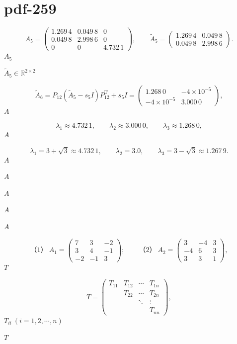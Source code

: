 \documentclass[UTF8,fontset=fandol]{ctexart}
\begin{document}
\section*{pdf-259}
\[
A_5=\begin{pmatrix}
1.269\,4&0.049\,8&0\\
0.049\,8&2.998\,6&0\\
0&0&\boxed{4.732\,1}
\end{pmatrix},\qquad
\widetilde A_5=\begin{pmatrix}1.269\,4&0.049\,8\\0.049\,8&2.998\,6\end{pmatrix}.
\]
$A_5$\par
$\widetilde A_5\in\mathbb R^{2\times2}$\par
\[
\widetilde A_6=P_{12}(\widetilde A_5-s_5I)P_{12}^{\mathrm T}+s_5I
=\begin{pmatrix}\boxed{1.268\,0}&-4\times10^{-5}\\-4\times10^{-5}&\boxed{3.000\,0}\end{pmatrix},
\]
$A$\par
\[
\lambda_1\approx4.732\,1,\qquad\lambda_2\approx3.000\,0,\qquad\lambda_3\approx1.268\,0,
\]
$A$\par
\[
\lambda_1=3+\sqrt3\approx4.732\,1,\qquad\lambda_2=3.0,\qquad\lambda_3=3-\sqrt3\approx1.267\,9.
\]
$A$\par
$A$\par
$A$\par
$A$\par
$A$\par
\[
\text{（1）}\ A_1=\begin{pmatrix}7&3&-2\\3&4&-1\\-2&-1&3\end{pmatrix};\qquad
\text{（2）}\ A_2=\begin{pmatrix}3&-4&3\\-4&6&3\\3&3&1\end{pmatrix},
\]
$T$\par
\[
T=\begin{pmatrix}
T_{11}&T_{12}&\cdots&T_{1n}\\
&T_{22}&\cdots&T_{2n}\\
&&\ddots&\vdots\\
&&&T_{nn}
\end{pmatrix},
\]
$T_{ii}\ (i=1,2,\cdots,n)$\par
$T$\par
\clearpage
\end{document}
